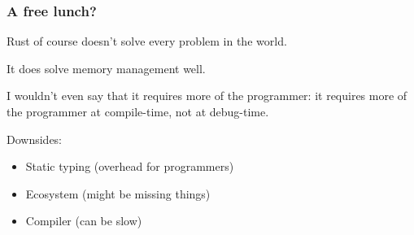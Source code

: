 \begin{frame}
\frametitle{A free lunch?}

 Rust of course doesn't solve every problem in the world. 
 
It does solve memory management well. 

I wouldn't even say that it requires more of the programmer: it requires more of the programmer at compile-time, not at debug-time.

Downsides: 

\begin{itemize}
	\item Static typing (overhead for programmers)
	\item Ecosystem (might be missing things)
	\item Compiler (can be slow)
\end{itemize}


\end{frame}





